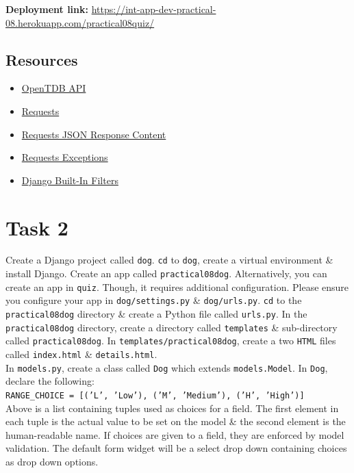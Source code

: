 \documentclass{article}
\begin{document}
\textbf{Deployment link:} \href{https://int-app-dev-practical-08.herokuapp.com/practical08quiz/}{https://int-app-dev-practical-08.herokuapp.com/practical08quiz/} 

\subsection*{Resources} 
\begin{itemize}
  \item \href{https://opentdb.com/}{OpenTDB API}
  \item \href{https://requests.readthedocs.io/en/master/}{Requests}
  \item \href{https://requests.readthedocs.io/en/master/user/quickstart/\#json-response-content}{Requests JSON Response Content}
  \item \href{https://requests.readthedocs.io/en/master/api/#exceptions}{Requests Exceptions}
  \item \href{https://docs.djangoproject.com/en/3.0/ref/templates/builtins/#built-in-filter-reference}{Django Built-In Filters}
\end{itemize}

\section*{Task 2} 
Create a Django project called \texttt{dog}. \texttt{cd} to \texttt{dog}, create a virtual environment \& install Django. Create an app called \texttt{practical08dog}. Alternatively, you can create an app in \texttt{quiz}. Though, it requires additional configuration. Please ensure you configure your app in \texttt{dog/settings.py} \& \texttt{dog/urls.py}. \texttt{cd} to the \texttt{practical08dog} directory \& create a Python file called \texttt{urls.py}. In the \texttt{practical08dog} directory, create a directory called \texttt{templates} \& sub-directory called \texttt{practical08dog}. In \texttt{templates/practical08dog}, create a two \texttt{HTML} files called \texttt{index.html} \& \texttt{details.html}. \\

In \texttt{models.py}, create a class called \texttt{Dog} which extends \texttt{models.Model}. In \texttt{Dog}, declare the following: \\

\texttt{RANGE\_CHOICE = [('L', 'Low'), ('M', 'Medium'), ('H', 'High')]} \\

Above is a list containing tuples used as choices for a field. The first element in each tuple is the actual value to be set on the model \& the second element is the human-readable name. If choices are given to a field, they are enforced by model validation. The default form widget will be a select drop down containing choices as drop down options. \\
\end{document}
